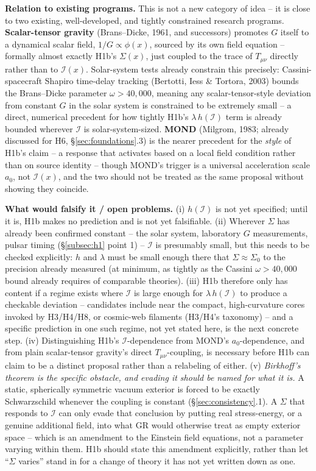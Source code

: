 \documentclass[12pt, a4paper]{article}
\begin{document}
\textbf{Relation to existing programs.} This is not a new category of
idea -- it is close to two existing, well-developed, and tightly
constrained research programs. \textbf{Scalar-tensor gravity}
(Brans--Dicke, 1961, and successors) promotes $G$ itself to a
dynamical scalar field, $1/G \propto \phi(x)$, sourced by its own field
equation -- formally almost exactly H1b's $\Sigma(x)$, just coupled to
the trace of $T_{\mu\nu}$ directly rather than to $\mathcal{I}(x)$.
Solar-system tests already constrain this precisely: Cassini-spacecraft
Shapiro time-delay tracking (Bertotti, Iess \& Tortora, 2003) bounds
the Brans--Dicke parameter $\omega > 40{,}000$, meaning any
scalar-tensor-style deviation from constant $G$ in the solar system is
constrained to be extremely small -- a direct, numerical precedent for
how tightly H1b's $\lambda\,h(\mathcal{I})$ term is already bounded
wherever $\mathcal{I}$ is solar-system-sized. \textbf{MOND} (Milgrom,
1983; already discussed for H6, \S\ref{sec:foundations}.3) is the
nearer precedent for the \emph{style} of H1b's claim -- a response
that activates based on a local field condition rather than on source
identity -- though MOND's trigger is a universal acceleration scale
$a_0$, not $\mathcal{I}(x)$, and the two should not be treated as the
same proposal without showing they coincide.

\textbf{What would falsify it / open problems.}
(i) $h(\mathcal{I})$ is not yet specified; until it is, H1b makes no
prediction and is not yet falsifiable. (ii) Wherever $\Sigma$ has
already been confirmed constant -- the solar system, laboratory $G$
measurements, pulsar timing (\S\ref{subsec:h1} point 1) -- $\mathcal{I}$
is presumably small, but this needs to be checked explicitly: $h$ and
$\lambda$ must be small enough there that $\Sigma \approx \Sigma_0$ to
the precision already measured (at minimum, as tightly as the
Cassini $\omega>40{,}000$ bound already requires of comparable
theories). (iii) H1b therefore only has content if a regime exists
where $\mathcal{I}$ is large enough for $\lambda\,h(\mathcal{I})$ to
produce a checkable deviation -- candidates include near the compact,
high-curvature cores invoked by H3/H4/H8, or cosmic-web filaments
(H3/H4's taxonomy) -- and a specific prediction in one such regime,
not yet stated here, is the next concrete step. (iv) Distinguishing
H1b's $\mathcal{I}$-dependence from MOND's $a_0$-dependence, and from
plain scalar-tensor gravity's direct $T_{\mu\nu}$-coupling, is
necessary before H1b can claim to be a distinct proposal rather than
a relabeling of either. (v) \emph{Birkhoff's theorem is the specific
obstacle, and evading it should be named for what it is.} A static,
spherically symmetric vacuum exterior is forced to be exactly
Schwarzschild whenever the coupling is constant
(\S\ref{sec:consistency}.1). A $\Sigma$ that responds to $\mathcal{I}$
can only evade that conclusion by putting real stress-energy, or a
genuine additional field, into what GR would otherwise treat as empty
exterior space -- which is an amendment to the Einstein field
equations, not a parameter varying within them. H1b should state this
amendment explicitly, rather than let ``$\Sigma$ varies'' stand in for
a change of theory it has not yet written down as one.
\end{document}

